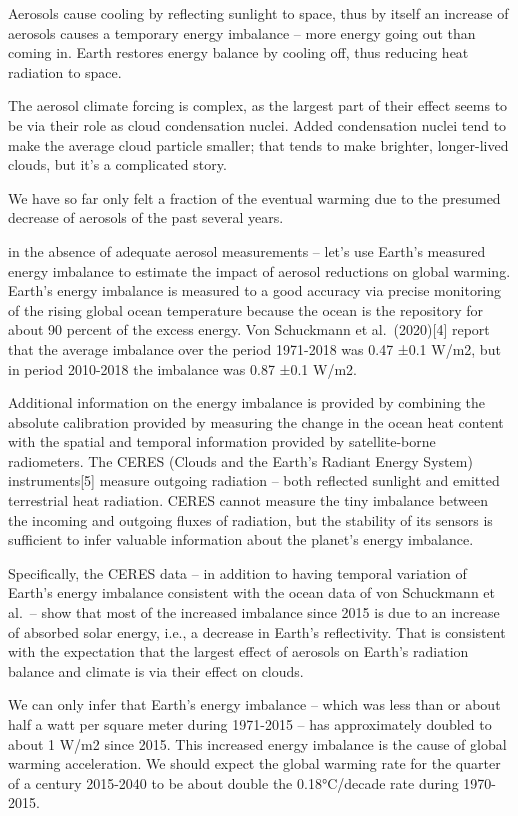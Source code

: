 \documentclass[
]{book}
\begin{document}
Aerosols cause cooling by reflecting sunlight to space, thus by itself an increase of aerosols causes a temporary energy imbalance -- more energy going out than coming in. Earth restores energy balance by cooling off, thus reducing heat radiation to space.

The aerosol climate forcing is complex, as the largest part of their effect seems to be via their role as cloud condensation nuclei. Added condensation nuclei tend to make the average cloud particle smaller; that tends to make brighter, longer-lived clouds, but it's a complicated story.

We have so far only felt a fraction of the eventual warming due to the presumed decrease of aerosols of the past several years.

in the absence of adequate aerosol measurements -- let's use Earth's measured energy imbalance to estimate the impact of aerosol reductions on global warming. Earth's energy imbalance is measured to a good accuracy via precise monitoring of the rising global ocean temperature because the ocean is the repository for about 90 percent of the excess energy. Von Schuckmann et al.~(2020){[}4{]} report that the average imbalance over the period 1971-2018 was 0.47 ±0.1 W/m2, but in period 2010-2018 the imbalance was 0.87 ±0.1 W/m2.

Additional information on the energy imbalance is provided by combining the absolute calibration provided by measuring the change in the ocean heat content with the spatial and temporal information provided by satellite-borne radiometers. The CERES (Clouds and the Earth's Radiant Energy System) instruments{[}5{]} measure outgoing radiation -- both reflected sunlight and emitted terrestrial heat radiation. CERES cannot measure the tiny imbalance between the incoming and outgoing fluxes of radiation, but the stability of its sensors is sufficient to infer valuable information about the planet's energy imbalance.

Specifically, the CERES data -- in addition to having temporal variation of Earth's energy imbalance consistent with the ocean data of von Schuckmann et al.~-- show that most of the increased imbalance since 2015 is due to an increase of absorbed solar energy, i.e., a decrease in Earth's reflectivity. That is consistent with the expectation that the largest effect of aerosols on Earth's radiation balance and climate is via their effect on clouds.

We can only infer that Earth's energy imbalance -- which was less than or about half a watt per square meter during 1971-2015 -- has approximately doubled to about 1 W/m2 since 2015. This increased energy imbalance is the cause of global warming acceleration. We should expect the global warming rate for the quarter of a century 2015-2040 to be about double the 0.18°C/decade rate during 1970-2015.
\end{document}
